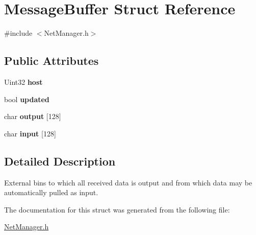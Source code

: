 \hypertarget{structMessageBuffer}{\section{Message\-Buffer Struct Reference}
\label{structMessageBuffer}
}


{\ttfamily \#include $<$Net\-Manager.\-h$>$}

\subsection*{Public Attributes}
\begin{DoxyCompactItemize}
\item 
\hypertarget{structMessageBuffer_ac442fa41e9a791e9d54763a527078c2f}{Uint32 {\bfseries host}}\label{structMessageBuffer_ac442fa41e9a791e9d54763a527078c2f}

\item 
\hypertarget{structMessageBuffer_aabe6147db39f683f38e1dbe110b78974}{bool {\bfseries updated}}\label{structMessageBuffer_aabe6147db39f683f38e1dbe110b78974}

\item 
\hypertarget{structMessageBuffer_aa404d75ae5fd1d61625480f57be5736a}{char {\bfseries output} \mbox{[}128\mbox{]}}\label{structMessageBuffer_aa404d75ae5fd1d61625480f57be5736a}

\item 
\hypertarget{structMessageBuffer_ac58f941129cac46cafc5fdaa005b2df5}{char {\bfseries input} \mbox{[}128\mbox{]}}\label{structMessageBuffer_ac58f941129cac46cafc5fdaa005b2df5}

\end{DoxyCompactItemize}


\subsection{Detailed Description}
External bins to which all received data is output and from which data may be automatically pulled as input. 

The documentation for this struct was generated from the following file\-:\begin{DoxyCompactItemize}
\item 
\hyperlink{NetManager_8h}{Net\-Manager.\-h}\end{DoxyCompactItemize}
